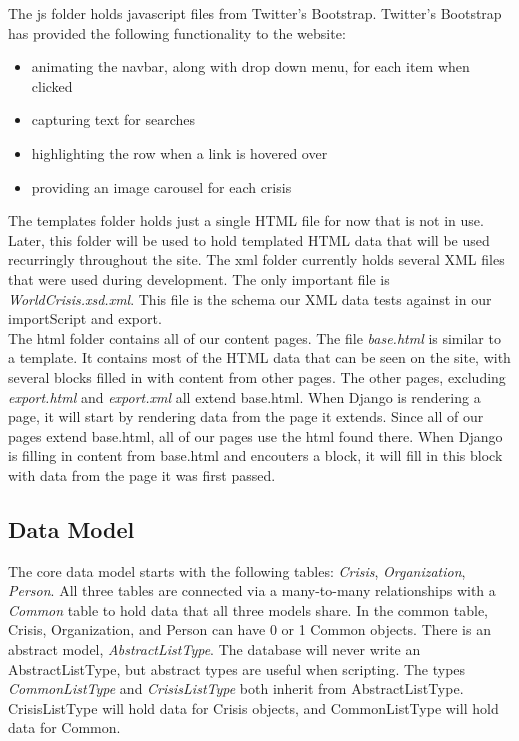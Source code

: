 \documentclass[12pt]{report}
\begin{document}
The js folder holds javascript files from Twitter's Bootstrap. Twitter's Bootstrap has provided the following functionality to the website:
\begin{itemize}
\item animating the navbar, along with drop down menu, for each item when clicked
\item capturing text for searches
\item highlighting the row when a link is hovered over
\item providing an image carousel for each crisis
\end{itemize}

The templates folder holds just a single HTML file for now that is not in use.
Later, this folder will be used to hold templated HTML data that will be used recurringly throughout the site.
The xml folder currently holds several XML files that were used during development.
The only important file is \emph{WorldCrisis.xsd.xml}.
This file is the schema our XML data tests against in our importScript and export.\\


The html folder contains all of our content pages.
The file \emph{base.html} is similar to a template.
It contains most of the HTML data that can be seen on the site, with several blocks filled in with content from other pages.
The other pages, excluding \emph{export.html} and \emph{export.xml} all extend base.html.
When Django is rendering a page, it will start by rendering data from the page it extends.
Since all of our pages extend base.html, all of our pages use the html found there.
When Django is filling in content from base.html and encouters a block,
it will fill in this block with data from the page it was first passed.\\

\newpage
\subsection*{Data Model}
\hfill



The core data model starts with the following tables: \emph{Crisis}, \emph{Organization}, \emph{Person}.
All three tables are connected via a many-to-many relationships with a \emph{Common} table to hold data that all three models share.
In the common table, Crisis, Organization, and Person can have 0 or 1 Common objects.
There is an abstract model, \emph{AbstractListType}.
The database will never write an AbstractListType, but abstract types are useful when scripting.
The types \emph{CommonListType} and \emph{CrisisListType} both inherit from AbstractListType.
CrisisListType will hold data for Crisis objects, and CommonListType will hold data for Common.
\end{document}
